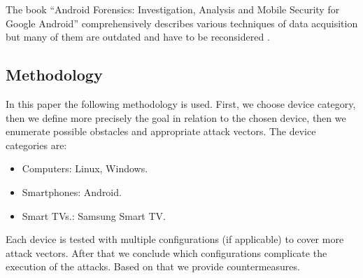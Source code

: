 The book “Android Forensics: Investigation, Analysis and Mobile Security for Google Android” comprehensively describes various techniques of data acquisition but many of them are outdated and have to be reconsidered \cite{evil-maid}.


\subsection{Methodology}

In this paper the following methodology is used. First, we choose device category,  then we define more precisely the goal in relation to the chosen device, then we enumerate possible obstacles and appropriate attack vectors. The device categories are:

\begin{itemize}
\item Computers: Linux, Windows.
\item Smartphones: Android.
\item Smart TVs.: Samsung Smart TV.
\end{itemize}

Each device is tested with multiple configurations (if applicable) to cover more attack vectors. After that we conclude which configurations complicate the execution of the attacks. Based on that we provide countermeasures.

